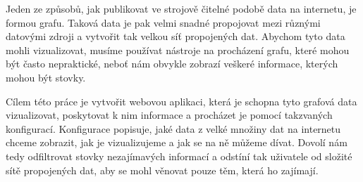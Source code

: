 \documentclass[12pt]{report}
\begin{document}

Jeden ze způsobů, jak publikovat ve strojově čitelné podobě data na internetu, je formou grafu. Taková data je pak velmi snadné propojovat mezi různými datovými zdroji a vytvořit tak velkou síť propojených dat. Abychom tyto data mohli vizualizovat, musíme používat nástroje na procházení grafu, které mohou být často nepraktické, neboť nám obvykle zobrazí veškeré informace, kterých mohou být stovky.

Cílem této práce je vytvořit webovou aplikaci, která je schopna tyto grafová data vizualizovat, poskytovat k nim informace a procházet je pomocí takzvaných konfigurací. Konfigurace popisuje, jaké data z velké množiny dat na internetu chceme zobrazit, jak je vizualizujeme a jak se na ně můžeme dívat. Dovolí nám tedy odfiltrovat stovky nezajímavých informací a odstíní tak uživatele od složité sítě propojených dat, aby se mohl věnovat pouze těm, která ho zajímají.
\end{document}
